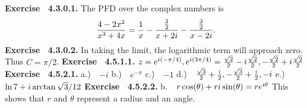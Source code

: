  {\noindent \protect \bf  Exercise ~4.3.0.1.} The PFD over the complex numbers is $$\protect \frac  {4-2x^2}{x^3+4x}=\protect \frac  {1}{x}-\protect \frac  {\protect \frac  {3}{2}}{x+2i}-\protect \frac  {\protect \frac  {3}{2}}{x-2i}. $$ \protect \newline  \protect \newline  
 {\noindent \protect \bf  Exercise ~4.3.0.2.} In taking the limit, the logarithmic term will approach zero. Thus $C=\pi /2$. \protect \newline  \protect \newline  
 {\noindent \protect \bf  Exercise ~4.5.1.1.} $z=e^{i (-\pi /4)}, e^{i(3 \pi /4)} = \protect \frac  {\protect \sqrt  {2}}{2} - i \protect \frac  {\protect \sqrt  {2}}{2},-\protect \frac  {\protect \sqrt  {2}}{2} + i \protect \frac  {\protect \sqrt  {2}}{2}$  \protect \newline  \protect \newline  
 {\noindent \protect \bf  Exercise ~4.5.2.1.} a.)~~$-i$ \protect \newline  b.)~~$e^{-\pi }$ \protect \newline  c.)~~$-1$ \protect \newline  d.)~~$\protect \frac  {\protect \sqrt  {3}}{2} + \protect \frac  {i}{2}, -\protect \frac  {\protect \sqrt  {3}}{2} + \protect \frac  {i}{2}, -i$ \protect \newline  e.)~~$\protect \qopname  \relax o{ln}{7} + i \protect \qopname  \relax o{arctan}{\protect \sqrt  {3}/12}$  \protect \newline  \protect \newline  
 {\noindent \protect \bf  Exercise ~4.5.2.2.} b.~~$r\protect \qopname  \relax o{cos}(\theta )+ri \protect \qopname  \relax o{sin}(\theta ) = re^{i \theta }$ This shows that $r$ and $\theta $ represent a radius and an angle.  \protect \newline  \protect \newline  
